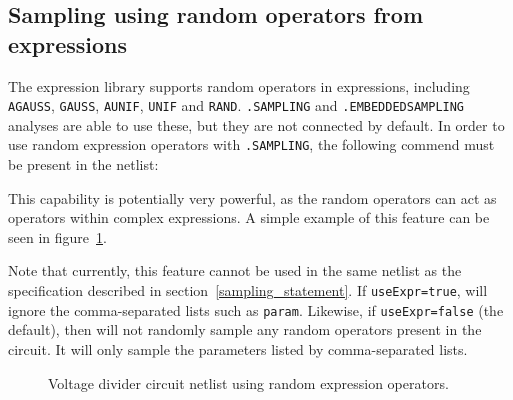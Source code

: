 \subsection{Sampling using random operators from expressions}

The \Xyce{} expression library supports random operators in expressions, 
including \texttt{AGAUSS}, \texttt{GAUSS}, \texttt{AUNIF}, \texttt{UNIF} and \texttt{RAND}.
\Xyce{} \texttt{.SAMPLING} and \texttt{.EMBEDDEDSAMPLING} analyses are able to use these, but they are not
connected by default.  In order to use random expression operators with \texttt{.SAMPLING}, 
the following commend must be present in the netlist:


This capability is potentially very powerful, as the random operators can 
act as operators within complex expressions.  A simple example of this feature can be 
seen in figure~\ref{Sampling_Netlist_4}.

Note that currently, this feature cannot be used in the same netlist as the 
specification described in section~\ref{sampling_statement}.  If 
\texttt{useExpr=true}, \Xyce{} will ignore the comma-separated lists such as 
\texttt{param}.  Likewise, if \texttt{useExpr=false} (the default), then 
\Xyce{} will not randomly sample any random operators present in the circuit.  
It will only sample the parameters listed by comma-separated lists.

\begin{figure}[htbp]
  \fontsize{9pt}{10pt}
\begin{centering}
\caption{Voltage divider circuit netlist using random expression operators.
\label{Sampling_Netlist_4}}
\end{centering}
\end{figure}



